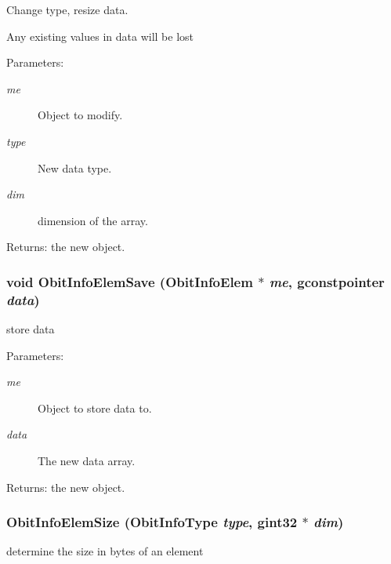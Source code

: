Change type, resize data. 

Any existing values in data will be lost \begin{Desc}
\item[Parameters:]
\begin{description}
\item[{\em me}]Object to modify. \item[{\em type}]New data type. \item[{\em dim}]dimension of the array. \end{description}
\end{Desc}
\begin{Desc}
\item[Returns:]the new object. \end{Desc}
\subsubsection{\setlength{\rightskip}{0pt plus 5cm}void Obit\-Info\-Elem\-Save ({\bf Obit\-Info\-Elem} $\ast$ {\em me}, gconstpointer {\em data})}\label{ObitInfoElem_8c_a6}


store data 

\begin{Desc}
\item[Parameters:]
\begin{description}
\item[{\em me}]Object to store data to. \item[{\em data}]The new data array. \end{description}
\end{Desc}
\begin{Desc}
\item[Returns:]the new object. \end{Desc}
\subsubsection{ Obit\-Info\-Elem\-Size (Obit\-Info\-Type {\em type}, gint32 $\ast$ {\em dim})}\label{ObitInfoElem_8c_a8}


determine the size in bytes of an element 

